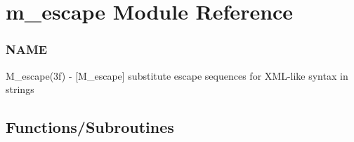 \hypertarget{namespacem__escape}{}\section{m\+\_\+escape Module Reference}
\label{namespacem__escape}


\subsubsection*{N\+A\+ME}

M\+\_\+escape(3f) -\/ \mbox{[}M\+\_\+escape\mbox{]} substitute escape sequences for X\+M\+L-\/like syntax in strings  


\subsection*{Functions/\+Subroutines}
